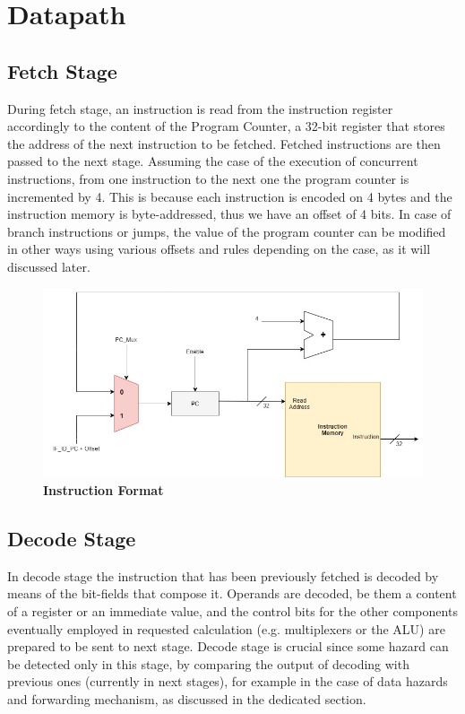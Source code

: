 %
 
\chapter{Datapath}
\label{cha2}
\section{Fetch Stage}
During fetch stage, an instruction is read from the instruction register accordingly to the content of the Program Counter, a 32-bit register that stores the address 
of the next instruction to be fetched. Fetched instructions are then passed to the next stage.
Assuming the case of the execution of concurrent instructions, from one instruction to the next one the program counter is incremented by 4. This is because each instruction 
is encoded on 4 bytes and the instruction memory is byte-addressed, thus we have an offset of 4 bits.
In case of branch instructions or jumps, the value of the program counter can be modified in other ways using various offsets and rules depending on the case, 
as it will discussed later.

\begin{figure}[!h]
    \centering
        \includegraphics[width=\linewidth]{schematic/InstructionMemory_withProgramCounter.jpg}
        \caption{\textbf{Instruction Format}}
\end{figure}
    

\section{Decode Stage}

In decode stage the instruction that has been previously fetched is decoded by means of the bit-fields that compose it.
Operands are decoded, be them a content of a register or an immediate value, and the control bits for the other components eventually employed in requested calculation 
(e.g. multiplexers or the ALU) are prepared to be sent to next stage.
Decode stage is crucial since some hazard can be detected only in this stage, by comparing the output of decoding with previous ones (currently in next stages), 
for example in the case of data hazards and forwarding mechanism, as discussed in the dedicated section.

